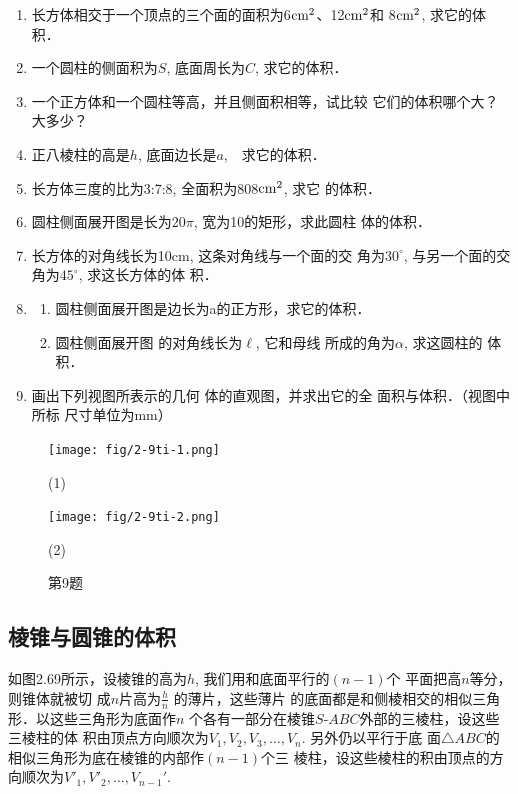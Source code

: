 \begin{ex}
\begin{enumerate}
    \item 长方体相交于一个顶点的三个面的面积为6${\rm cm^2}$、12${\rm cm^2}$和
    8${\rm cm^2}$, 求它的体积．
    \item 一个圆柱的侧面积为$S$, 底面周长为$C$, 求它的体积．
    \item 一个正方体和一个圆柱等高，并且侧面积相等，试比较
    它们的体积哪个大？大多少？
    \item 正八棱柱的高是$h$, 底面边长是$a$,　求它的体积．
    \item 
    长方体三度的比为3:7:8, 全面积为808${\rm cm^2}$, 求它
    的体积．
    \item 
    圆柱侧面展开图是长为$20\pi$, 宽为10的矩形，求此圆柱
    体的体积．
    \item 长方体的对角线长为10cm, 这条对角线与一个面的交
    角为$30^{\circ}$, 与另一个面的交角为$45^{\circ}$, 求这长方体的体
    积．
\item \begin{enumerate}
    \item 圆柱侧面展开图是边长为a的正方形，求它的体积．
    \item 圆柱侧面展开图
的对角线长为$\ell$, 它和母线
所成的角为$\alpha$, 求这圆柱的
体积．
\end{enumerate}

\item 画出下列视图所表示的几何
体的直观图，并求出它的全
面积与体积．（视图中所标
尺寸单位为mm）
\end{enumerate}
\end{ex}

\begin{figure}[htp]\centering
    \begin{minipage}[t]{0.48\textwidth}
    \centering
\texttt{[image: fig/2-9ti-1.png]}
    \caption*{(1)}
    \end{minipage}
    \begin{minipage}[t]{0.48\textwidth}
    \centering
\texttt{[image: fig/2-9ti-2.png]}
    \caption*{(2)}
    \end{minipage}
    \caption*{第9题}
    \end{figure}


\subsection{棱锥与圆锥的体积}

如图2.69所示，设棱锥的高为$h$, 
我们用和底面平行的$(n-1)$个
平面把高$n$等分，则锥体就被切
成$n$片高为$\frac{h}{n}$
的薄片，这些薄片
的底面都是和侧棱相交的相似三角形．以这些三角形为底面作$n$
个各有一部分在棱锥$S$-$ABC$外部的三棱柱，设这些三棱柱的体
积由顶点方向顺次为$V_1,V_2,V_3,\ldots,V_n$. 另外仍以平行于底
面$\triangle ABC$的相似三角形为底在棱锥的内部作$(n-1)$个三
棱柱，设这些棱柱的积由顶点的方向顺次为$V'_1,V'_2,\ldots,V_{n-1}'$.

